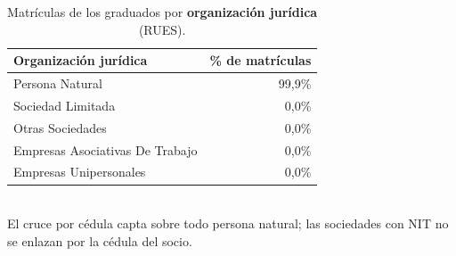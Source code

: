 \begin{table}[H]\centering\footnotesize
\caption{Matrículas de los graduados por \textbf{organización jurídica} (RUES).}\label{tab:rues_org}
\begin{tabular}{lr}
\toprule
\rowcolor{ustaazul}\textbf{\color{white}Organización jurídica} & \textbf{\color{white}\% de matrículas} \\
\midrule
Persona Natural & 99,9\% \\
Sociedad Limitada & 0,0\% \\
Otras Sociedades & 0,0\% \\
Empresas Asociativas De Trabajo & 0,0\% \\
Empresas Unipersonales & 0,0\% \\
\bottomrule
\end{tabular}
\\[2pt]{\scriptsize\color{ustagris} El cruce por cédula capta sobre todo persona natural; las sociedades con NIT no se enlazan por la cédula del socio.}
\end{table}